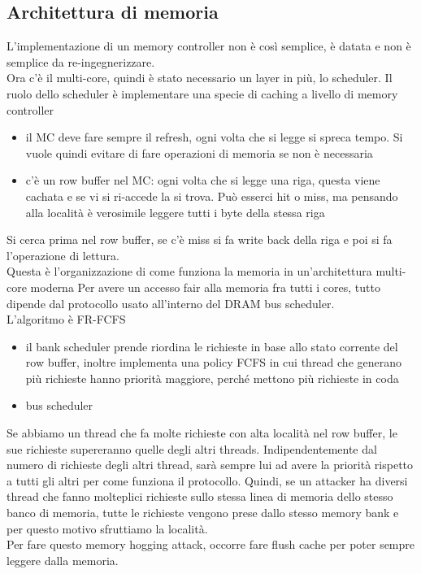\documentclass[12pt, oneside]{extbook} %
\begin{document}
\subsection{Architettura di memoria}
L'implementazione di un memory controller non è così semplice, è datata e non è semplice da re-ingegnerizzare.\\ Ora c'è il multi-core, quindi è stato necessario un layer in più, lo scheduler. Il ruolo dello scheduler è implementare una specie di caching a livello di memory controller
\begin{itemize}
\item il MC deve fare sempre il refresh, ogni volta che si legge si spreca tempo. Si vuole quindi evitare di fare operazioni di memoria se non è necessaria
\item c'è un row buffer nel MC: ogni volta che si legge una riga, questa viene cachata e se vi si ri-accede la si trova. Può esserci hit o miss, ma pensando alla località è verosimile leggere tutti i byte della stessa riga
\end{itemize}
Si cerca prima nel row buffer, se c'è miss si fa write back della riga e poi si fa l'operazione di lettura.\\ Questa è l'organizzazione di come funziona la memoria in un'architettura multi-core moderna
Per avere un accesso fair alla memoria fra tutti i cores, tutto dipende dal protocollo usato all'interno del DRAM bus scheduler.\\L'algoritmo è FR-FCFS
\begin{itemize}
\item il bank scheduler prende riordina le richieste in base allo stato corrente del row buffer, inoltre implementa una policy FCFS in cui thread che generano più richieste hanno priorità maggiore, perché mettono più richieste in coda
\item bus scheduler 
\end{itemize}
Se abbiamo un thread che fa molte richieste con alta località nel row buffer, le sue richieste supereranno quelle degli altri threads. Indipendentemente dal numero di richieste degli altri thread, sarà sempre lui ad avere la priorità rispetto a tutti gli altri per come funziona il protocollo. Quindi, se un attacker ha diversi thread che fanno molteplici richieste sullo stessa linea di memoria dello stesso banco di memoria, tutte le richieste vengono prese dallo stesso memory bank e per questo motivo sfruttiamo la località.\\Per fare questo memory hogging attack, occorre fare flush cache per poter sempre leggere dalla memoria.
\end{document}

